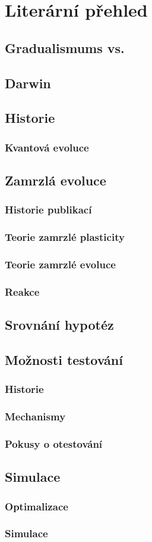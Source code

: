 \chapter{Literární přehled}

\section{Gradualismums vs.}

\section{Darwin}

\section{Historie}

\subsection{Kvantová evoluce}

\section{Zamrzlá evoluce}
\subsection{Historie publikací}
\subsection{Teorie zamrzlé plasticity}
\subsection{Teorie zamrzlé evoluce}
\subsection{Reakce}

\section{Srovnání hypotéz}

\section{Možnosti testování}
\subsection{Historie}
\subsection{Mechanismy}
\subsection{Pokusy o otestování}

\section{Simulace}
\subsection{Optimalizace}
\subsection{Simulace}
